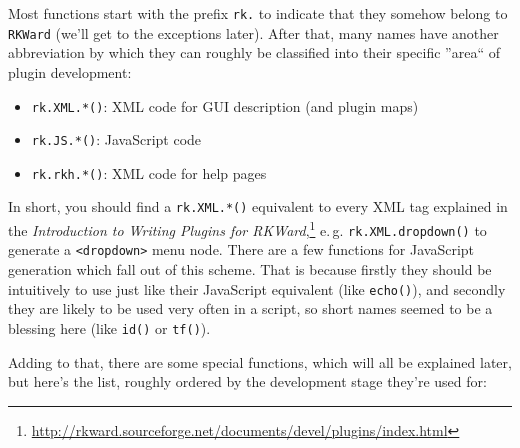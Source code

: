 \documentclass[a4paper,10pt]{scrartcl}
\begin{document}
Most functions start with the prefix  \texttt{rk.} to indicate that they somehow belong to  \texttt{RKWard}
(we'll get to the exceptions later). After that, many names have another abbreviation by which they can
roughly be classified into their specific ''area`` of plugin development:

\begin{itemize}
	\item  \texttt{rk.XML.*()}: XML code for GUI description (and plugin maps)
	\item  \texttt{rk.JS.*()}: JavaScript code
	\item  \texttt{rk.rkh.*()}: XML code for help pages
\end{itemize}

In short, you should find a \texttt{rk.XML.*()} equivalent to every XML tag explained in the
\textit{Introduction to Writing Plugins for
RKWard},\footnote{\url{http://rkward.sourceforge.net/documents/devel/plugins/index.html}}
e.\,g. \texttt{rk.XML.dropdown()} to generate a \texttt{<dropdown>} menu node. There are a few functions for
JavaScript generation which fall out of this scheme. That is because firstly they should be intuitively to use
just like their JavaScript equivalent (like \texttt{echo()}), and secondly they are likely to be used very often
in a script, so short names seemed to be a blessing here (like \texttt{id()} or \texttt{tf()}).

Adding to that, there are some special functions, which will all be explained later, but here's the list,
roughly ordered by the development stage they're used for:
\end{document}

